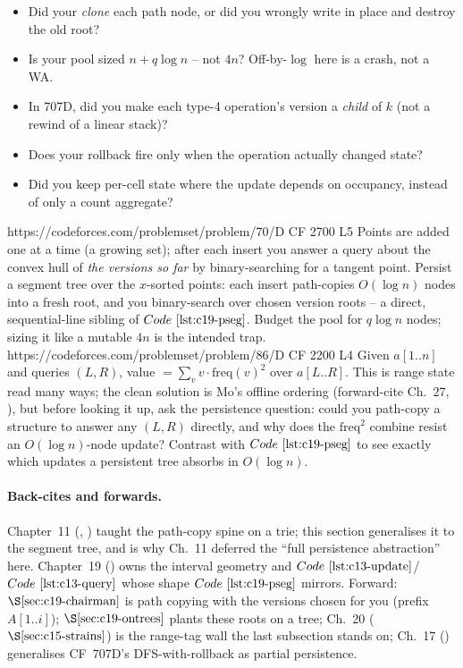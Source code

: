\begin{stuckbox}
\begin{itemize}[nosep,leftmargin=1.4em]
  \item Did your  \emph{clone} each path node, or did you wrongly write in place and destroy the old root?
  \item Is your pool sized \(n + q\log n\) -- not \(4n\)?  Off-by-\(\log\) here is a crash, not a WA.
  \item In 707D, did you make each type-4 operation's version a \emph{child} of \(k\) (not a rewind of a linear stack)?
  \item Does your rollback fire only when the operation actually changed state?
  \item Did you keep per-cell state where the update depends on occupancy, instead of only a count aggregate?
\end{itemize}
\end{stuckbox}

\begin{practiceset}
    {https://codeforces.com/problemset/problem/70/D}
    {CF 2700 L5}
    {Points are added one at a time (a growing set); after each insert you answer a query about the convex hull of \emph{the versions so far} by binary-searching for a tangent point.  Persist a segment tree over the \(x\)-sorted points: each insert path-copies \(O(\log n)\) nodes into a fresh root, and you binary-search over chosen version roots -- a direct, sequential-line sibling of \(\coderef{c19-pseg}\).  Budget the pool for \(q\log n\) nodes; sizing it like a mutable \(4n\) is the intended trap.}
    {https://codeforces.com/problemset/problem/86/D}
    {CF 2200 L4}
    {Given \(a[1..n]\) and queries \((L,R)\), value \(=\sum_v v\cdot\mathrm{freq}(v)^2\) over \(a[L..R]\).  This is range state read many ways; the clean solution is Mo's offline ordering (forward-cite Ch.~27, ), but before looking it up, ask the persistence question: could you path-copy a structure to answer any \((L,R)\) directly, and why does the \(\mathrm{freq}^2\) combine resist an \(O(\log n)\)-node update?  Contrast with \(\coderef{c19-pseg}\) to see exactly which updates a persistent tree absorbs in \(O(\log n)\).}
\end{practiceset}

\paragraph{Back-cites and forwards.}
Chapter~11 (, ) taught the path-copy spine on a trie; this section generalises it to the segment tree, and is why Ch.~11 deferred the ``full persistence abstraction'' here.  Chapter~19 () owns the interval geometry and \(\coderef{c13-update}\)/\(\coderef{c13-query}\) whose shape \(\coderef{c19-pseg}\) mirrors.  Forward: \(\secref{c19-chairman}\) is path copying with the versions chosen for you (prefix \(A[1..i]\)); \(\secref{c19-ontrees}\) plants these roots on a tree; Ch.~20 (\(\secref{c15-strains}\)) is the range-tag wall the last subsection stands on; Ch.~17 () generalises CF~707D's DFS-with-rollback as partial persistence.

